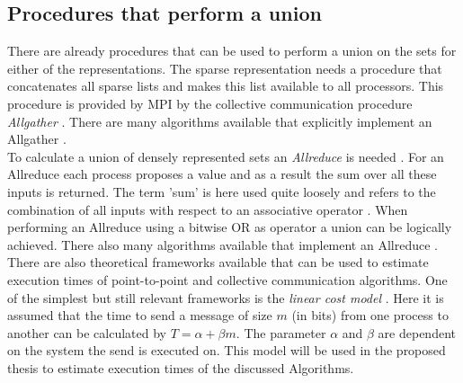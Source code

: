 \documentclass[a4paper,%
	12pt,%
	DIV14,
	headsepline,%
	headings=normal,
]{scrartcl}
\theoremstyle{definition}
\theoremstyle{remark}
\begin{document}
\subsection{Procedures that perform a union}
There are already procedures that can be used to perform a union on the sets for either of the representations. The sparse representation needs a procedure that concatenates all sparse lists and makes this list available to all processors. This procedure is provided by MPI by the collective communication procedure \emph{Allgather} \cite{mpi}. There are many algorithms available that explicitly implement an Allgather \cite{allgather}. \\
To calculate a union of densely represented sets an \emph{Allreduce} is needed \cite{graphPartitioning}. For an Allreduce each process proposes a value and as a result the sum over all these inputs is returned. The term 'sum' is here used quite loosely and refers to the combination of all inputs with respect to an associative operator \cite{mpi}. When performing an Allreduce using a bitwise OR as operator a union can be logically achieved. There also many algorithms available that implement an Allreduce \cite{AllreduceSummaryAll}. \\
There are also theoretical frameworks available that can be used to estimate execution times of point-to-point and collective communication algorithms. One of the simplest but still relevant frameworks is the \emph{linear cost model} \cite{costModels, hockneyLinearCostModel}. Here it is assumed that the time to send a message of size $m$ (in bits) from one process to another can be calculated by $T=\alpha + \beta m$. The parameter $\alpha$ and $\beta$ are dependent on the system the send is executed on. This model will be used in the proposed thesis to estimate execution times of the discussed Algorithms.
\end{document}

